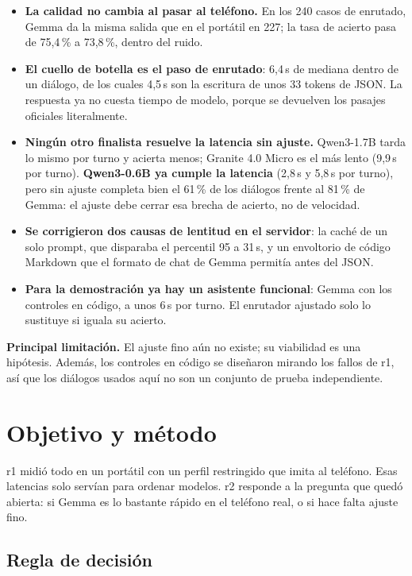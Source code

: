 \documentclass[11pt,a4paper]{article}
\begin{document}
\begin{itemize}
\item \textbf{La calidad no cambia al pasar al teléfono.} En los 240 casos de enrutado, Gemma da la misma salida que en el portátil en 227; la tasa de acierto pasa de 75,4\,\% a 73,8\,\%, dentro del ruido.
\item \textbf{El cuello de botella es el paso de enrutado}: 6,4\,s de mediana dentro de un diálogo, de los cuales 4,5\,s son la escritura de unos 33 tokens de JSON. La respuesta ya no cuesta tiempo de modelo, porque se devuelven los pasajes oficiales literalmente.
\item \textbf{Ningún otro finalista resuelve la latencia sin ajuste.} Qwen3-1.7B tarda lo mismo por turno y acierta menos; Granite 4.0 Micro es el más lento (9,9\,s por turno). \textbf{Qwen3-0.6B ya cumple la latencia} (2,8\,s y 5,8\,s por turno), pero sin ajuste completa bien el 61\,\% de los diálogos frente al 81\,\% de Gemma: el ajuste debe cerrar esa brecha de acierto, no de velocidad.
\item \textbf{Se corrigieron dos causas de lentitud en el servidor}: la caché de un solo prompt, que disparaba el percentil 95 a 31\,s, y un envoltorio de código Markdown que el formato de chat de Gemma permitía antes del JSON.
\item \textbf{Para la demostración ya hay un asistente funcional}: Gemma con los controles en código, a unos 6\,s por turno. El enrutador ajustado solo lo sustituye si iguala su acierto.
\end{itemize}

\textbf{Principal limitación.} El ajuste fino aún no existe; su viabilidad es una hipótesis. Además, los controles en código se diseñaron mirando los fallos de r1, así que los diálogos usados aquí no son un conjunto de prueba independiente.

\newpage

\section{Objetivo y método}

r1 midió todo en un portátil con un perfil restringido que imita al teléfono. Esas latencias solo servían para ordenar modelos. r2 responde a la pregunta que quedó abierta: si Gemma es lo bastante rápido en el teléfono real, o si hace falta ajuste fino.

\subsection{Regla de decisión}
\end{document}
